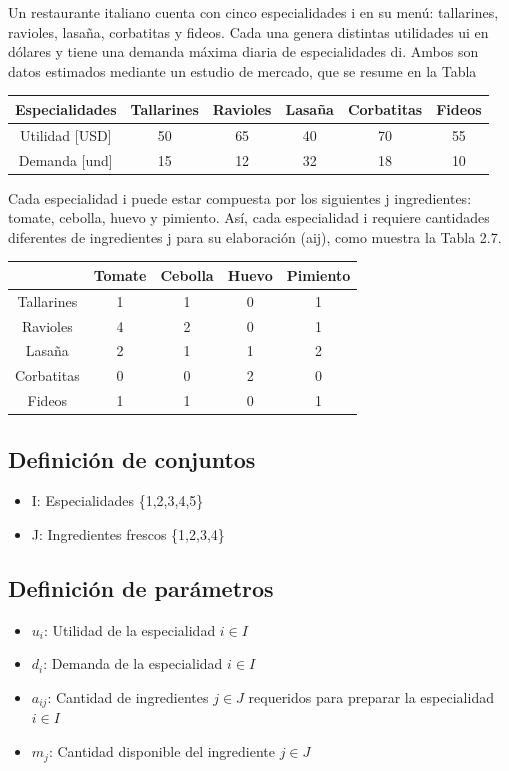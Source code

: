 \documentclass{article}
\begin{document}
Un restaurante italiano cuenta con cinco especialidades i en su menú:
tallarines, ravioles, lasaña, corbatitas y fideos. Cada una genera distintas
utilidades ui en dólares y tiene una demanda máxima diaria de especialidades
di. Ambos son datos estimados mediante un estudio de mercado, que se
resume en la Tabla \bigskip

\begin{tabular}{|c|ccccc|}
\hline
Especialidades & Tallarines & Ravioles & Lasaña & Corbatitas & Fideos \\
\hline
Utilidad [USD] & 50 & 65 & 40 & 70 & 55 \\
Demanda [und] & 15 & 12 & 32 & 18 & 10 \\
\hline
\end{tabular}
\bigskip

Cada especialidad i puede estar compuesta por los siguientes j ingredientes:
tomate, cebolla, huevo y pimiento. Así, cada especialidad i requiere cantidades
diferentes de ingredientes j para su elaboración (aij), como muestra la Tabla 2.7.
\bigskip

\begin{tabular}{|c|cccc|}
\hline
& Tomate & Cebolla & Huevo & Pimiento \\
\hline
Tallarines & 1 & 1 & 0 & 1 \\
Ravioles & 4 & 2 & 0 & 1 \\
Lasaña & 2 & 1 & 1 & 2 \\
Corbatitas & 0 & 0 & 2 & 0 \\
Fideos & 1 & 1 & 0 & 1 \\
\hline
\end{tabular}

\subsection*{Definición de conjuntos}
\begin{itemize}
    \item I: Especialidades \{1,2,3,4,5\}
    \item J: Ingredientes frescos \{1,2,3,4\}
\end{itemize}

\subsection*{Definición de parámetros}
\begin{itemize}
    \item $u_{i}$: Utilidad de la especialidad $i \in I$
    \item $d_{i}$: Demanda de la especialidad $i \in I$
    \item $a_{ij}$: Cantidad de ingredientes $j \in J$ requeridos para preparar la especialidad $i \in I$
    \item $m_{j}$: Cantidad disponible del ingrediente $j \in J$
\end{itemize}
\end{document}
